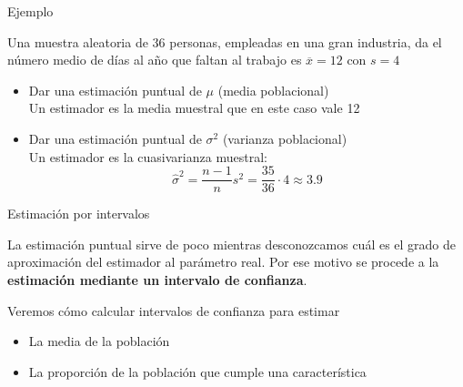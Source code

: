 \documentclass[11pt,handout]{beamer}
\begin{document}
\begin{frame}{Ejemplo}
\begin{block}{}
Una muestra aleatoria de 36 personas, empleadas en una gran industria, da el número medio de días al año que faltan al trabajo es $\overline{x} = 12$ con $s = 4$
\end{block}

\begin{itemize}[<+->]
    \item Dar una estimación puntual de $\mu$ (media poblacional)
    \pause 
    \\ Un estimador es la media muestral que en este caso vale 12
    \item Dar una estimación puntual de $\sigma^2$ (varianza poblacional)
    \pause 
    \\ Un estimador es la cuasivarianza muestral:
    $$\widehat{\sigma}^2=\frac{n-1}{n}s^2=\frac{35}{36}\cdot 4\approx 3.9$$
\end{itemize}

\end{frame}


\begin{frame}{Estimación por intervalos}
\begin{block}{}
La estimación puntual sirve de poco mientras
desconozcamos cuál es el grado de aproximación del estimador al parámetro real. Por ese motivo se procede
a la \textbf{estimación mediante un intervalo de confianza}.
\end{block}
\pause
Veremos cómo calcular intervalos de confianza para estimar
\begin{itemize}
    \item La media de la población
    \item La proporción de la población que cumple una característica
\end{itemize}
\end{frame}
\end{document}
